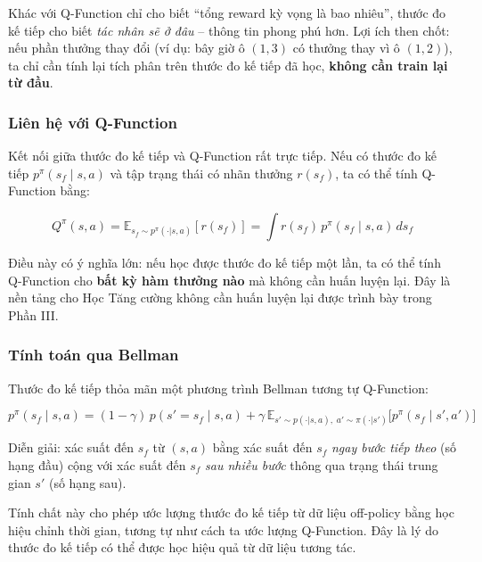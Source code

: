 Khác với Q-Function chỉ cho biết ``tổng reward kỳ vọng là bao nhiêu'',
thước đo kế tiếp cho biết \textit{tác nhân sẽ ở đâu} -- thông tin phong
phú hơn. Lợi ích then chốt: nếu phần thưởng thay đổi (ví dụ: bây giờ ô
$(1,3)$ có thưởng thay vì ô $(1,2)$), ta chỉ cần tính lại tích phân
trên thước đo kế tiếp đã học, \textbf{không cần train lại từ đầu}.

\subsubsection{Liên hệ với Q-Function}
 
Kết nối giữa thước đo kế tiếp và Q-Function rất trực tiếp. Nếu có
thước đo kế tiếp $p^\pi(s_f \mid s, a)$ và tập trạng thái có nhãn
thưởng $r(s_f)$, ta có thể tính Q-Function bằng:
 
\begin{equation}
    Q^\pi(s, a) = \mathbb{E}_{s_f \sim p^\pi(\cdot|s,a)} \left[
    r(s_f) \right] = \int r(s_f) \, p^\pi(s_f \mid s, a) \, ds_f
    \label{eq:q_from_succ}
\end{equation}
 
Điều này có ý nghĩa lớn: nếu học được thước đo kế tiếp một lần, ta có
thể tính Q-Function cho \textbf{bất kỳ hàm thưởng nào} mà không
cần huấn luyện lại. Đây là nền tảng cho Học Tăng cường không cần huấn luyện lại được trình bày
trong Phần III.
 
\subsubsection{Tính toán qua Bellman}
 
Thước đo kế tiếp thỏa mãn một phương trình Bellman tương tự
Q-Function:
 
\begin{equation}
    p^\pi(s_f \mid s, a) = (1-\gamma) \, p(s' = s_f \mid s, a)
    + \gamma \, \mathbb{E}_{s' \sim p(\cdot|s,a), \; a' \sim \pi(\cdot|s')}
    \bigl[ p^\pi(s_f \mid s', a') \bigr]
    \label{eq:bellman_succ}
\end{equation}

Diễn giải: xác suất đến $s_f$ từ $(s,a)$ bằng xác suất đến $s_f$
\textit{ngay bước tiếp theo} (số hạng đầu) cộng với xác suất đến $s_f$
\textit{sau nhiều bước} thông qua trạng thái trung gian $s'$ (số hạng
sau).

Tính chất này cho phép ước lượng thước đo kế tiếp từ dữ liệu
off-policy bằng học hiệu chỉnh thời gian, tương tự như cách ta ước
lượng Q-Function. Đây là lý do thước đo kế tiếp có thể được học hiệu
quả từ dữ liệu tương tác.
 
